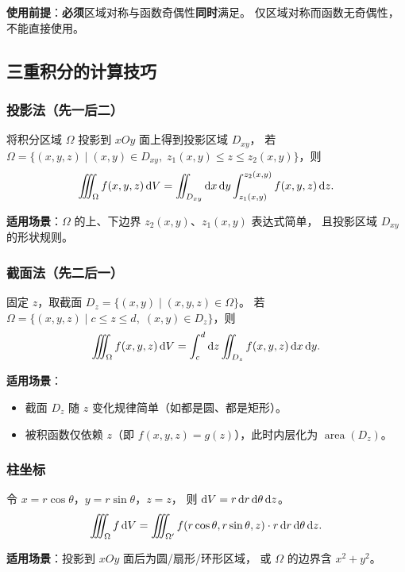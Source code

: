 \documentclass{ctexart}
\DeclareMathOperator{\area}{area}
\begin{document}
\textbf{使用前提}：\textbf{必须}区域对称与函数奇偶性\textbf{同时}满足。
仅区域对称而函数无奇偶性，不能直接使用。

\subsection{三重积分的计算技巧}

\subsubsection*{投影法（先一后二）}

将积分区域 $\Omega$ 投影到 $xOy$ 面上得到投影区域 $D_{xy}$，
若 $\Omega = \{(x,y,z) \mid (x,y) \in D_{xy},\; z_1(x,y) \le z \le z_2(x,y)\}$，则
\[
  \iiint_\Omega f(x,y,z) \,\mathrm{d} V
  = \iint_{D_{xy}} \mathrm{d} x\,\mathrm{d} y \int_{z_1(x,y)}^{z_2(x,y)} f(x,y,z) \,\mathrm{d} z.
\]

\textbf{适用场景}：$\Omega$ 的上、下边界 $z_2(x,y)$、$z_1(x,y)$ 表达式简单，
且投影区域 $D_{xy}$ 的形状规则。

\subsubsection*{截面法（先二后一）}

固定 $z$，取截面 $D_z = \{(x,y) \mid (x,y,z) \in \Omega\}$。
若 $\Omega = \{(x,y,z) \mid c \le z \le d,\; (x,y) \in D_z\}$，则
\[
  \iiint_\Omega f(x,y,z) \,\mathrm{d} V
  = \int_c^d \mathrm{d} z \iint_{D_z} f(x,y,z) \,\mathrm{d} x\,\mathrm{d} y.
\]

\textbf{适用场景}：
\begin{itemize}
  \item 截面 $D_z$ 随 $z$ 变化规律简单（如都是圆、都是矩形）。
  \item 被积函数仅依赖 $z$（即 $f(x,y,z) = g(z)$），此时内层化为 $\area(D_z)$。
\end{itemize}

\subsubsection*{柱坐标}

令 $x = r\cos\theta$，$y = r\sin\theta$，$z = z$，
则 $\mathrm{d} V = r \,\mathrm{d} r\,\mathrm{d} \theta\,\mathrm{d} z$。
\[
  \iiint_\Omega f \,\mathrm{d} V
  = \iiint_{\Omega'} f(r\cos\theta, r\sin\theta, z) \cdot r \,\mathrm{d} r\,\mathrm{d} \theta\,\mathrm{d} z.
\]

\textbf{适用场景}：投影到 $xOy$ 面后为圆/扇形/环形区域，
或 $\Omega$ 的边界含 $x^2+y^2$。
\end{document}

